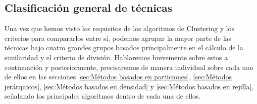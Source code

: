 \documentclass[3p,twocolumn]{elsarticle}
\begin{document}


\subsection{\textbf{Clasificación general de técnicas}} \label{subsec:Clasificación general de técnicas}

\cite{16} Una vez que hemos visto los requisitos de los algoritmos de Clustering y los criterios para compararlos entre sí, podemos agrupar la mayor parte de las técnicas bajo cuatro grandes grupos basados principalmente en el cálculo de la similaridad y el criterio de división. Hablaremos brevemente sobre estos a continuación y posteriormente, precisaremos de manera individual sobre cada uno de ellos en las secciones \ref{sec:Métodos basados en particiones}, \ref{sec:Métodos jerárquicos}, \ref{sec:Métodos basados en densidad} y \ref{sec:Métodos basados en rejilla}, señalando los principales algoritmos dentro de cada una de ellos.
\end{document}
